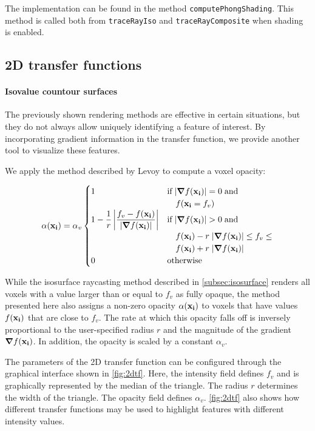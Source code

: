 \documentclass[a4paper]{article}
\begin{document}
The implementation can be found in the method {\tt computePhongShading}. This method is called both from {\tt traceRayIso} and {\tt traceRayComposite} when shading is enabled.

\subsection{2D transfer functions}

\paragraph{Isovalue countour surfaces}

The previously shown rendering methods are effective in certain situations, but they do not always allow uniquely identifying a feature of interest. By incorporating gradient information in the transfer function, we provide another tool to visualize these features.

We apply the method described by Levoy\citep{levoy_1988} to compute a voxel opacity:

\begin{equation*}
\alpha(\vb{x_i}) = \alpha_v
\begin{cases}
  1 &\text{if}\;|\grad f(\vb{x_i})| = 0\;\text{and}\\
  &\quad f(\vb{x_i} = f_v)\\
  1 - \dfrac{1}{r} \left| \dfrac{f_v - f(\vb{x_i})}{|\grad f(\vb{x_i})|}\right| &\text{if}\; |\grad f(\vb{x_i})| > 0\;\text{and}\;\\
  &\quad f(\vb{x_i}) - r\; |\grad f(\vb{x_i})| \leq f_v \leq\\
  &\quad f(\vb{x_i}) + r\; |\grad f(\vb{x_i})|\\
  0 &\text{otherwise}
\end{cases}
\end{equation*}

While the isosurface raycasting method described in \autoref{subsec:isosurface} renders all voxels with a value larger than or equal to $f_v$ as fully opaque, the method presented here also assigns a non-zero opacity $\alpha(\vb{x_i})$ to voxels that have values $f(\vb{x_i})$ that are close to $f_v$. The rate at which this opacity falls off is inversely proportional to the user-specified radius $r$ and the magnitude of the gradient $\grad f(\vb{x_i})$. In addition, the opacity is scaled by a constant $\alpha_v$.

The parameters of the 2D transfer function can be configured through the graphical interface shown in \autoref{fig:2dtf}. Here, the intensity field defines $f_v$ and is graphically represented by the median of the triangle. The radius $r$ determines the width of the triangle. The opacity field defines $\alpha_v$. \autoref{fig:2dtf} also shows how different transfer functions may be used to highlight features with different intensity values.
\end{document}
